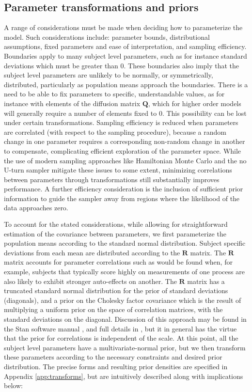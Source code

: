 \documentclass[nojss]{jss}\usepackage[]{graphicx}\usepackage[]{color}
\newcommand{\vect}[1]{\boldsymbol{\mathbf{#1}}}
\begin{document}
\subsection{Parameter transformations and priors}
A range of considerations must be made when deciding how to parameterize the model. Such considerations include: parameter bounds, distributional assumptions, fixed parameters and ease of interpretation, and sampling efficiency.
Boundaries apply to many subject level parameters, such as for instance standard deviations which must be greater than 0. These boundaries also imply that the subject level parameters are unlikely to be normally, or symmetrically, distributed, particularly as population means approach the boundaries. 
There is a need to be able to fix parameters to specific, understandable values, as for instance with elements of the diffusion matrix $\vect{Q}$, which for higher order models will generally require a number of elements fixed to 0. This possibility can be lost under certain transformations.
Sampling efficiency is reduced when parameters are correlated (with respect to the sampling procedure), because a random change in one parameter requires a corresponding non-random change in another to compensate, complicating efficient exploration of the parameter space. While the use of modern sampling approaches like Hamiltonian Monte Carlo \citep{betancourt2013hamiltonian} and the no U-turn sampler \citep{homan2014nouturn} mitigate these issues to some extent, minimizing correlations between parameters through transformations still substantially improves performance. A further efficiency consideration is the inclusion of sufficient prior information to guide the sampler away from regions where the likelihood of the data approaches zero.

To account for the stated considerations, while allowing for straightforward estimation of the covariance between parameters, we first parameterize the population means according to the standard normal distribution. Subject specific deviations from each mean are distributed according to the $\vect{R}$ matrix. The $\vect{R}$ matrix accounts for parameter correlations such as would be found when, for example, subjects that typically score highly on measurements of one process are also likely to exhibit stronger auto-effects on another. The $\vect{R}$ matrix has a truncated standard normal distribution for the prior of standard deviations (diagonals), and a prior on the Cholesky factor covariance which is the result of multiplying a uniform prior on the space of correlation matrices, with the standard deviations on the diagonal.  Discussion of this approach may be found in the Stan software manual \citep{standevelopmentteam2016stan}, and full details in \cite{lewandowski2009generating}, but it in general has the virtue that the prior for correlations is independent of the scale.  At this point, all the subject level parameters have a multivariate-normal prior, but we then transform these parameters according to the necessary constraints and desired prior distribution. The precise forms and resulting prior densities are specified in Appendix \ref{app:transforms}, but are intuitively described along with implications below:
\end{document}
